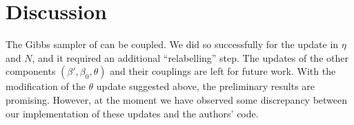 \documentclass{article}
\begin{document}
\section{Discussion}

The Gibbs sampler of \citet{tancredi2018unified} can be 
coupled. We did so successfully for the update
in $\eta$ and $N$, and it required an additional 
``relabelling'' step. The updates of the other components
$(\beta',\beta_0,\theta)$ and their couplings are left 
for future work. With the modification of the $\theta$ update
suggested above, the preliminary results are promising.
However, at the moment we have observed some discrepancy
between our implementation of these updates and the authors' code.


\end{document}
